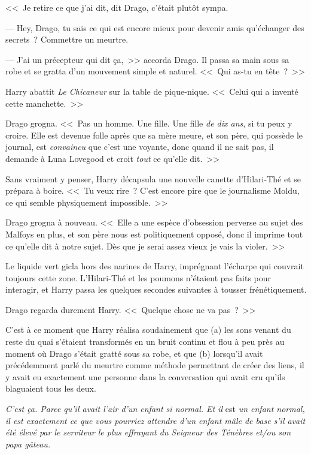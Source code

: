 <<~Je retire ce que j'ai dit, dit Drago, c'était plutôt sympa.

--- Hey, Drago, tu sais ce qui est encore mieux pour devenir amis qu'échanger des secrets~? Commettre un meurtre.

--- J'ai un précepteur qui dit ça,~>> accorda Drago. Il passa sa main sous sa robe et se gratta d'un mouvement simple et naturel. <<~Qui as-tu en tête~?~>>

Harry abattit \emph{Le Chicaneur} sur la table de pique-nique. <<~Celui qui a inventé cette manchette.~>>

Drago grogna. <<~Pas un homme. Une fille. Une fille \emph{de dix ans}, si tu peux y croire. Elle est devenue folle après que sa mère meure, et son père, qui possède le journal, est \emph{convaincu} que c'est une voyante, donc quand il ne sait pas, il demande à Luna Lovegood et croit \emph{tout} ce qu'elle dit.~>>

Sans vraiment y penser, Harry décapsula une nouvelle canette d'Hilari-Thé et se prépara à boire. <<~Tu veux rire~? C'est encore pire que le journalisme Moldu, ce qui semble physiquement impossible.~>>

Drago grogna à nouveau. <<~Elle a une espèce d'obsession perverse au sujet des Malfoys en plus, et son père nous est politiquement opposé, donc il imprime tout ce qu'elle dit à notre sujet. Dès que je serai assez vieux je vais la violer.~>>

Le liquide vert gicla hors des narines de Harry, imprégnant l'écharpe qui couvrait toujours cette zone. L'Hilari-Thé et les poumons n'étaient pas faits pour interagir, et Harry passa les quelques secondes suivantes à tousser frénétiquement.

Drago regarda durement Harry. <<~Quelque chose ne va pas~?~>>

C'est à ce moment que Harry réalisa soudainement que (a) les sons venant du reste du quai s'étaient transformés en un bruit continu et flou à peu près au moment où Drago s'était gratté sous sa robe, et que (b) lorsqu'il avait précédemment parlé du meurtre comme méthode permettant de créer des liens, il y avait eu exactement une personne dans la conversation qui avait cru qu'ils blaguaient tous les deux.

\emph{C'est ça. Parce qu'il avait l'air d'un enfant si normal. Et il} est \emph{un enfant normal, il est exactement ce que vous pourriez attendre d'un enfant mâle de base s'il avait été élevé par le serviteur le plus effrayant du Seigneur des Ténèbres et/ou son papa gâteau.}


